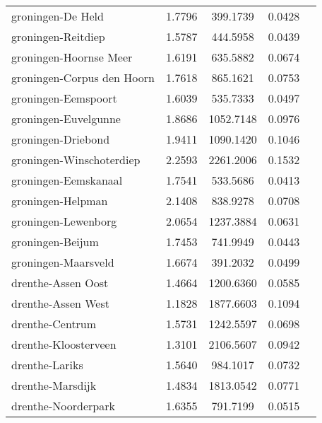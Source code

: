\begin{longtable}{llccc}
	groningen-De Held                         & 1.7796  & 399.1739  & 0.0428                 \\
	groningen-Reitdiep                        & 1.5787  & 444.5958  & 0.0439                 \\
	groningen-Hoornse Meer                    & 1.6191  & 635.5882  & 0.0674                 \\
	groningen-Corpus den Hoorn                & 1.7618  & 865.1621  & 0.0753                 \\
	groningen-Eemspoort                       & 1.6039  & 535.7333  & 0.0497                 \\
	groningen-Euvelgunne                      & 1.8686  & 1052.7148 & 0.0976                 \\
	groningen-Driebond                        & 1.9411  & 1090.1420 & 0.1046                 \\
	groningen-Winschoterdiep                  & 2.2593  & 2261.2006 & 0.1532                 \\
	groningen-Eemskanaal                      & 1.7541  & 533.5686  & 0.0413                 \\
	groningen-Helpman                         & 2.1408  & 838.9278  & 0.0708                 \\
	groningen-Lewenborg                       & 2.0654  & 1237.3884 & 0.0631                 \\
	groningen-Beijum                          & 1.7453  & 741.9949  & 0.0443                 \\
	groningen-Maarsveld                       & 1.6674  & 391.2032  & 0.0499                 \\
	drenthe-Assen Oost                        & 1.4664  & 1200.6360 & 0.0585                 \\
	drenthe-Assen West                        & 1.1828  & 1877.6603 & 0.1094                 \\
	drenthe-Centrum                           & 1.5731  & 1242.5597 & 0.0698                 \\
	drenthe-Kloosterveen                      & 1.3101  & 2106.5607 & 0.0942                 \\
	drenthe-Lariks                            & 1.5640  & 984.1017  & 0.0732                 \\
	drenthe-Marsdijk                          & 1.4834  & 1813.0542 & 0.0771                 \\
	drenthe-Noorderpark                       & 1.6355  & 791.7199  & 0.0515                 \\

\end{longtable}
